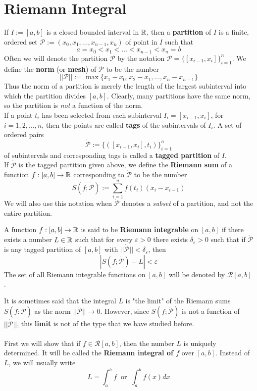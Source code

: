 \section{Riemann Integral}

\begin{definition}
	If $I:=[a,b]$ is a closed bounded interval in $\mathbb{R}$, then a \textbf{partition} of $I$ is a finite, ordered set $\mathcal{P}:=(x_0, x_1, \dots, x_{n-1}, x_n)$ of point in $I$ such that
	\[a = x_0 < x_1 < \dots < x_{n-1} < x_n = b\]
	Often we will denote the partition $\mathcal{P}$ by the notation $\mathcal{P}=\{[x_{i-1},x_i]\}_{i=1}^n$. We define the \textbf{norm} (or \textbf{mesh}) of $\mathcal{P}$ to be the number
	\[||\mathcal{P}||:=\max\{x_1-x_0, x_2-x_1, \dots, x_n-x_{n-1}\}\]
	Thus the norm {of a partition is merely the length of the largest subinterval into which the partition divides $[a,b]$. Clearly, many partitions have the same norm, so the partition is \textit{not}} a function of the norm.
	\\If a point $t_i$ has been selected from each subinterval $I_i=[x_{i-1},x_i]$, for $i=1,2,\dots,n$, then the points are called \textbf{tags} of the subintervals of $I_i$. A set of ordered pairs
	\[\dot{\mathcal{P}}:=\{([x_{i-1},x_i],t_i)\}_{i=1}^{n}\]
	of subintervals and corresponding tags is called a \textbf{tagged partition} of $I$.
	\\If $\dot{\mathcal{P}}$ is the tagged partition given above, we define the \textbf{Riemann sum} of a function $f:[a,b] \to \mathbb{R}$ corresponding to $\dot{\mathcal{P}}$ to be the number
	\[S(f;\dot{\mathcal{P}}):=\sum\limits_{i=1}^{n} f(t_i)(x_i-x_{i-1})\]
	We will also use this notation when $\dot{\mathcal{P}}$ denotes a \textit{subset} of a partition, and not the entire partition.
\end{definition}

\begin{definition}
	A function $f:[a,b] \to \mathbb{R}$ is said to be \textbf{Riemann integrable} on $[a,b]$ if there exists a number $L \in \mathbb{R}$ such that for every $\varepsilon >0$ there exists $\delta_\varepsilon >0$ such that if $\dot{\mathcal{P}}$ is any tagged partition of $[a,b]$ with $||\dot{\mathcal{P}}||<\delta_\varepsilon$, then
	\[|S(f;\dot{\mathcal{P}})-L|<\varepsilon\]
	The set of all Riemann integrable functions on $[a,b]$ will be denoted by $\mathcal{R}[a,b]$.
\end{definition}

\begin{remark}
	It is sometimes said that the integral $L$ is "the limit" of the Riemann sums $S(f:\dot{\mathcal{P}})$ as the norm $||\dot{\mathcal{P}}|| \to 0$. However, since $S(f;\dot{\mathcal{P}})$ is not a function of $||\dot{\mathcal{P}}||$, this \textbf{limit} is not of the type that we have studied before.
	\\\\First we will show that if $f \in \mathcal{R}[a,b]$, then the number $L$ is uniquely determined. It will be called the \textbf{Riemann integral of $f$} over $[a,b]$. Instead of $L$, we will usually write
	\[L=\int_{a}^{b}f\ \text{ or }\ \int_{a}^{b}f(x)dx\]
\end{remark}

